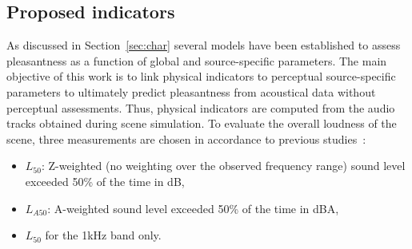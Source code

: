 \documentclass{article}
\begin{document}
\begin{sloppy}
\subsection{Proposed indicators}

As discussed in Section~\ref{sec:char} several models have been established to assess pleasantness as a function of global and source-specific parameters. The main objective of this work is to link physical indicators to perceptual source-specific parameters to ultimately predict pleasantness from acoustical data without perceptual assessments. Thus, physical indicators are computed from the audio tracks obtained during scene simulation. To evaluate the overall loudness of the scene, three measurements are chosen in accordance to previous studies~\cite{decoensel2006, ricciardi2014, aumond2017}:
\begin{itemize}
\item $L_{50}$: Z-weighted (no weighting over the observed frequency range) sound level exceeded 50\% of the time in dB,
\item $L_{A50}$: A-weighted sound level exceeded 50\% of the time in dBA,
\item $L_{50}$ for the 1kHz band only.
\end{itemize}



\end{sloppy}
\end{document}
